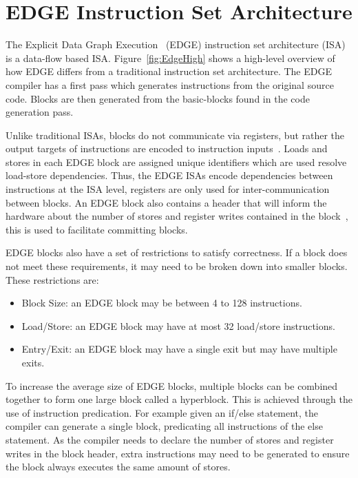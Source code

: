 \section{EDGE Instruction Set Architecture}\label{chp:bg:sec:edge}
The Explicit Data Graph Execution~\cite{burger04edge} (EDGE) instruction set architecture (ISA) is a data-flow based ISA.
Figure~\ref{fig:EdgeHigh} shows a high-level overview of how EDGE differs from a traditional instruction set architecture.
The EDGE compiler has a first pass which generates instructions from the original source code.
Blocks are then generated from the basic-blocks found in the code generation pass.

Unlike traditional ISAs, blocks do not communicate via registers, but rather the output targets of instructions are encoded to instruction inputs~\cite{smith2006edge}.
Loads and stores in each EDGE block are assigned unique identifiers which are used resolve load-store dependencies.
Thus, the EDGE ISAs encode dependencies between instructions at the ISA level, registers are only used for inter-communication between blocks.
An EDGE block also contains a header that will inform the hardware about the number of stores and register writes contained in the block~\cite{e2paper}, this is used to facilitate committing blocks.

EDGE blocks also have a set of restrictions to satisfy correctness.
If a block does not meet these requirements, it may need to be broken down into smaller blocks.
These restrictions are:

\begin{itemize}
\item Block Size: an EDGE block may be between 4 to 128 instructions.
\item Load/Store: an EDGE block may have at most 32 load/store instructions.
\item Entry/Exit: an EDGE block may have a single exit but may have multiple exits.
\end{itemize}

To increase the average size of EDGE blocks, multiple blocks can be combined together to form one large block called a hyperblock.
This is achieved through the use of instruction predication.
For example given an if/else statement, the compiler can generate a single block, predicating all instructions of the else statement.
As the compiler needs to declare the number of stores and register writes in the block header, extra instructions may need to be generated to ensure the block always executes the same amount of stores.

